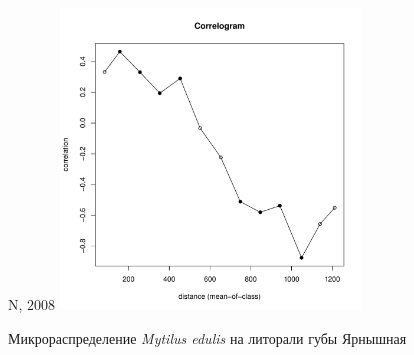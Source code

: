 	\begin{figure}[h]
	\begin{minipage}[b]{.5\linewidth}
	\begin{center}
	{\small N, $2008$}
	\includegraphics[width=80mm]{../Barenc_Sea/distribution_Moran/Yarnyshnaya07_moran_N_Mytilus_edulis_.pdf}
	\end{center}
	\end{minipage}

	\caption{Микрораспределение {\it Mytilus edulis} на литорали губы Ярнышная}
	\label{ris:moransI_Yarnyshnaya_Mytilus}
	\end{figure}


